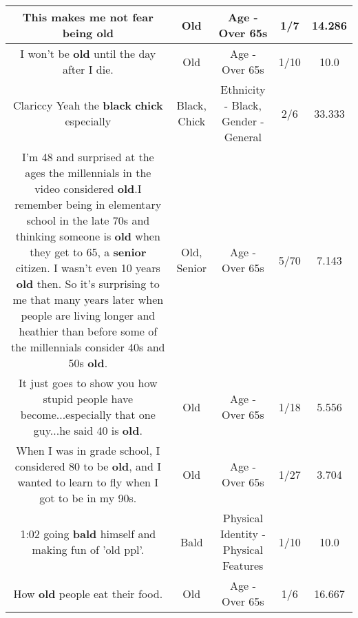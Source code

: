 \documentclass[11pt]{article}
\newlength\mylength
\begin{document}
\begin{center}
\begin{longtable}{|C{.65\mylength}|C{.30\mylength}|C{.12\mylength}|C{.12\mylength}|C{.12\mylength}|}
  \small This makes me not fear being old\normalsize   & Old & Age - Over 65s & 1/7 & 14.286 \\  \hline
  \small I won't be \textbf{old} until the day after I die.\normalsize   & Old & Age - Over 65s & 1/10 & 10.0 \\  \hline
  \small Clariccy Yeah the \textbf{black} \textbf{chick} especially\normalsize   & Black, Chick & Ethnicity - Black, Gender - General & 2/6 & 33.333 \\  \hline
  \small I'm 48 and surprised at the ages the millennials in the video considered \textbf{old}.I remember being in elementary school in the late 70s and thinking someone is \textbf{old} when they get to 65, a \textbf{senior} citizen. I wasn't even 10 years \textbf{old} then. So it's surprising to me that many years later when people are living longer and heathier than before some of the millennials consider 40s and 50s \textbf{old}.\normalsize   & Old, Senior & Age - Over 65s & 5/70 & 7.143 \\  \hline
  \small It just goes to show you how stupid people have become...especially that one guy...he said 40 is \textbf{old}.\normalsize   & Old & Age - Over 65s & 1/18 & 5.556 \\  \hline
  \small When I was in grade school,  I considered 80 to be \textbf{old},  and I wanted to learn to fly when I got to be in my 90s.\normalsize   & Old & Age - Over 65s & 1/27 & 3.704 \\  \hline
  \small 1:02 going \textbf{bald} himself and making fun of 'old ppl'.\normalsize   & Bald & Physical Identity - Physical Features & 1/10 & 10.0 \\  \hline
  \small How \textbf{old} people eat their food.\normalsize   & Old & Age - Over 65s & 1/6 & 16.667 \\  \hline

\end{longtable}
\end{center}
\end{document}
